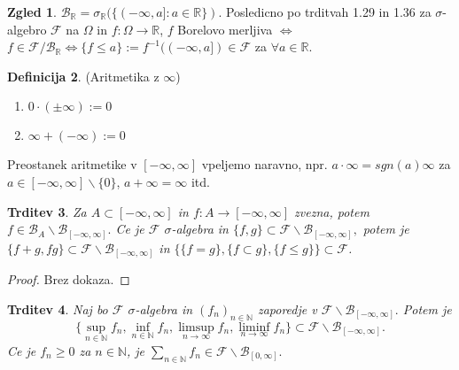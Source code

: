 \documentclass[a4paper,12pt]{article}
\theoremstyle{definition} %
\newtheorem{definicija}{Definicija}[section]
\newtheorem{zgled}[definicija]{Zgled}
\theoremstyle{plain} %
\newtheorem{trditev}[definicija]{Trditev}
\newcommand{\R}{\mathbb{R}}
\newcommand{\N}{\mathbb{N}}
\newcommand{\F}{\mathcal{F}}
\begin{document}
            \begin{zgled}
                    $\mathcal{B}_\R = \sigma_\R(\{(-\infty, a]: a \in \R\})$. Posledicno po trditvah 1.29 in 1.36 za $\sigma$-algebro $\F$ na $\Omega$ in $f:\Omega \rightarrow \R$, $f$ Borelovo merljiva $\iff$ $f \in \F/\mathcal{B}_\R \iff \{f \leq a\}:= f^{-1}((-\infty, a]) \in \F$ za $\forall a \in \R.$
            \end{zgled}
            \pagebreak
            \begin{definicija} (Aritmetika z $\infty$)
                 \begin{enumerate}
                    \item $0\cdot (\pm\infty) := 0$
                    \item $\infty + (-\infty) := 0$
                 \end{enumerate}
                 Preostanek aritmetike v $[-\infty, \infty]$ vpeljemo naravno, npr. $a \cdot \infty = sgn(a)\infty$ za $a \in [-\infty, \infty]\backslash\{0\}$, $a + \infty = \infty$ itd.
            \end{definicija}

            \begin{trditev}
                Za $A \subset [-\infty, \infty]$ in $f:A \rightarrow [-\infty, \infty]$ zvezna, potem $f \in \mathcal{B}_A\backslash\mathcal{B}_{[-\infty, \infty]}.$ Ce je $\F$ $\sigma$-algebra 
                in $\{f, g\} \subset \F\backslash\mathcal{B}_{[-\infty, \infty]},$ potem je $\{f+g, fg\} \subset \F\backslash\mathcal{B}_{[-\infty, \infty]}$ in $\{\{f=g\}, \{f\subset g\}, \{f \leq g\}\} \subset \F$.
            \end{trditev}

            \begin{proof}
                Brez dokaza.
            \end{proof}

            \begin{trditev}
                Naj bo $\F$ $\sigma$-algebra in $\left(f_n\right)_{n \in \N}$ zaporedje v $\F\backslash\mathcal{B}_{[-\infty, \infty]}.$
                Potem je $$\{\sup_{n \in \N}f_n, \inf_{n \in \N}f_n, \limsup_{n \rightarrow \infty}f_n, \liminf_{n \rightarrow \infty}f_n \} \subset \F\backslash\mathcal{B}_{[-\infty, \infty]}.$$
                Ce je $f_n \geq 0$ za $n \in \N$, je $\sum_{n \in \N}f_n \in \F\backslash\mathcal{B}_{[0, \infty]}.$
            \end{trditev}
\end{document}
